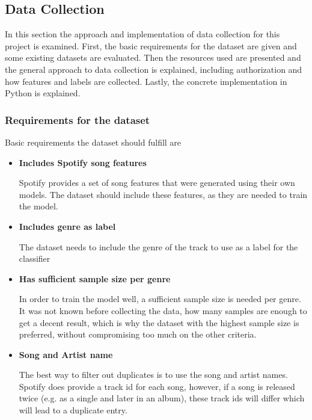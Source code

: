 \subsection{Data Collection}
\label{sec:Data Collection}

In this section the approach and implementation of data collection for this project is 
examined. First, the basic requirements for the dataset are given and some existing datasets
are evaluated. Then the resources used are presented and the general approach to data collection
is explained, including authorization and how features and labels are collected.
Lastly, the concrete implementation in Python is explained.

\subsubsection{Requirements for the dataset}

Basic requirements the dataset should fulfill are

\begin{itemize}
    \item \textbf{Includes Spotify song features}

    Spotify provides a set of song features that were generated using their own models.
    The dataset should include these features, as they are needed to train the model.
    
    \item \textbf{Includes genre as label}

    The dataset needs to include the genre of the track to use as a label for the classifier

    \item \textbf{Has sufficient sample size per genre}

    In order to train the model well, a sufficient sample size is needed per genre.
    It was not known before collecting the data, how many samples are enough to get a decent result,
    which is why the dataset with the highest sample size is preferred, without compromising too
    much on the other criteria. 

    \item \textbf{Song and Artist name}

    The best way to filter out duplicates is to use the song and artist names.
    Spotify does provide a track id for each song, however, if a song is released twice
    (e.g. as a single and later in an album), these track ids will differ which will lead
    to a duplicate entry.
\end{itemize}

